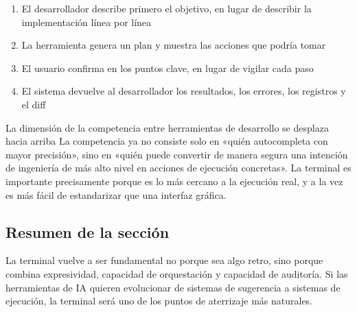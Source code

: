 \begin{enumerate}
    \item El desarrollador describe primero el objetivo, en lugar de describir la implementación línea por línea
    \item La herramienta genera un plan y muestra las acciones que podría tomar
    \item El usuario confirma en los puntos clave, en lugar de vigilar cada paso
    \item El sistema devuelve al desarrollador los resultados, los errores, los registros y el diff
\end{enumerate}

\begin{importantbox}{La dimensión de la competencia entre herramientas de desarrollo se desplaza hacia arriba}
La competencia ya no consiste solo en «quién autocompleta con mayor precisión», sino en «quién puede convertir de manera segura una intención de ingeniería de más alto nivel en acciones de ejecución concretas». La terminal es importante precisamente porque es lo más cercano a la ejecución real, y a la vez es más fácil de estandarizar que una interfaz gráfica.
\end{importantbox}

\subsection{Resumen de la sección}

La terminal vuelve a ser fundamental no porque sea algo retro, sino porque combina expresividad, capacidad de orquestación y capacidad de auditoría. Si las herramientas de IA quieren evolucionar de sistemas de sugerencia a sistemas de ejecución, la terminal será uno de los puntos de aterrizaje más naturales.
